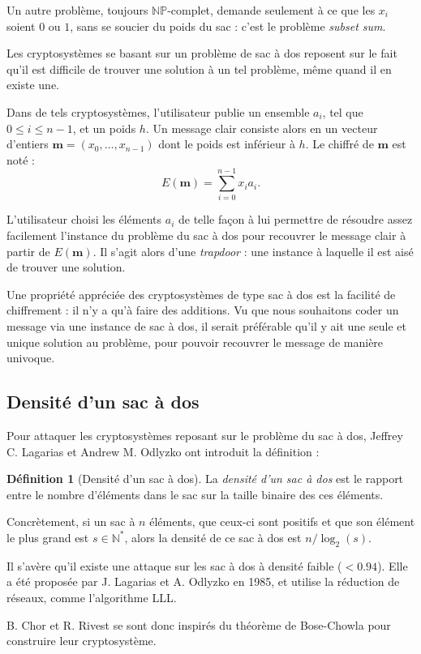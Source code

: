 \documentclass[a4paper, titlepage]{article}
\theoremstyle{definition}
\newtheorem{defi}[theo]{Définition}
\theoremstyle{remark}
\def\N{\mathbb N}
\def\mbf#1{\mathbf{#1}}
\def\NP{\mathbb{NP}}
\begin{document}
Un autre problème, toujours $\NP$-complet, demande seulement à ce que les $x_i$ soient $0$ ou $1$, sans se soucier du poids du sac : c'est le problème \textit{subset sum}.

Les cryptosystèmes se basant sur un problème de sac à dos reposent sur le fait qu'il est difficile de trouver une solution à un tel problème, même quand il en existe une. 

Dans de tels cryptosystèmes, l'utilisateur publie un ensemble $a_i$, tel que $0 \leqslant i \leqslant n-1$, et un poids $h$. Un message clair consiste alors en un vecteur d'entiers $\mbf m = (x_0, \dots, x_{n-1})$ dont le poids est inférieur à $h$. Le chiffré de $\mbf m$ est noté :
$$E(\mbf m) = \sum_{i=0}^{n-1} x_ia_i.$$

L'utilisateur choisi les éléments $a_i$ de telle façon à lui permettre de résoudre assez facilement l'instance du problème du sac à dos pour recouvrer le message clair à partir de $E(\mbf m)$. Il s'agit alors d'une \textit{trapdoor} : une instance à laquelle il est aisé de trouver une solution.

Une propriété appréciée des cryptosystèmes de type sac à dos  est la facilité de chiffrement : il n'y a qu'à faire des additions. Vu que nous souhaitons coder un message via une instance de sac à dos, il serait préférable qu'il y ait une seule et unique solution au problème, pour pouvoir recouvrer le message de manière univoque.

\subsection{Densité d'un sac à dos}
Pour attaquer les cryptosystèmes reposant sur le problème du sac à dos, Jeffrey C. Lagarias et Andrew M. Odlyzko ont introduit la définition :
\begin{defi}[Densité d'un sac à dos]
La \textit{densité d'un sac à dos} est le rapport entre le nombre d'éléments dans le sac sur la taille binaire des ces éléments.
\end{defi}
Concrètement, si un sac à $n$ éléments, que ceux-ci sont positifs et que son élément le plus grand est $s \in \N^*$, alors la densité de ce sac à dos est $n/\log_2(s)$.

Il s'avère qu'il existe une attaque sur les sac à dos à  densité faible ($< 0.94$). Elle a été proposée par J. Lagarias et A. Odlyzko en 1985, et utilise la réduction de réseaux, comme l'algorithme LLL.

B. Chor et R. Rivest se sont donc inspirés du théorème de Bose-Chowla pour construire leur cryptosystème.
\end{document}
